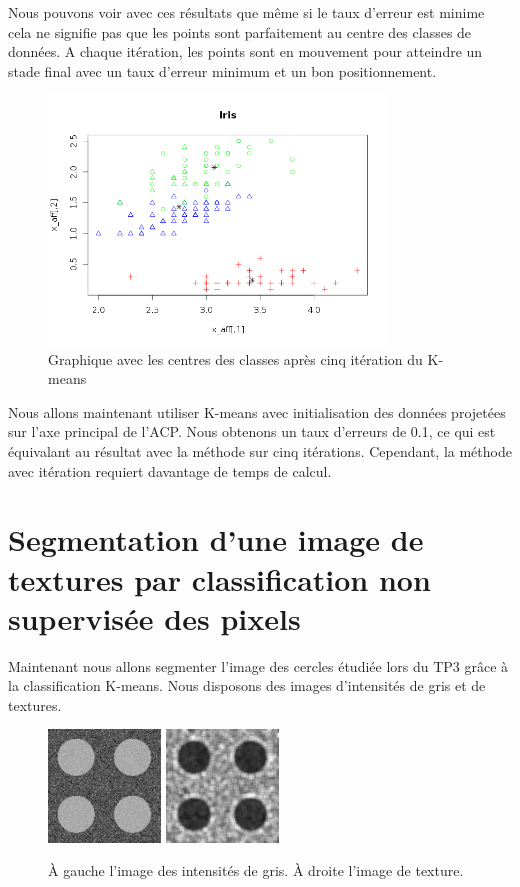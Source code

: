 \documentclass[a4paper,11pt]{article}
\begin{document}
  Nous pouvons voir avec ces résultats que même si le taux d'erreur est minime cela ne signifie pas
  que les points sont parfaitement au centre des classes de données. A chaque itération, les points
  sont en mouvement pour atteindre un stade final avec un taux d'erreur minimum et un bon positionnement.
 
  \begin{figure}[H]
    \center
    \includegraphics[width=9cm]{resultat/5_ite.png}
    \caption{Graphique avec les centres des classes après cinq itération du K-means}
  \end{figure}
  
  Nous allons maintenant utiliser K-means avec initialisation des données projetées sur l'axe principal
  de l'ACP. Nous obtenons un taux d'erreurs de 0.1, ce qui est équivalant au résultat avec la méthode
  sur cinq itérations. Cependant, la méthode avec itération requiert davantage de temps de calcul.
  
  
  \section{Segmentation d'une image de textures par classification non supervisée des pixels}
  Maintenant nous allons segmenter l'image des cercles étudiée lors du TP3 grâce à la classification
  K-means. Nous disposons des images d'intensités de gris et de textures.
  
  \begin{figure}[H]
    \center
    \includegraphics[width=3cm]{resultat/rdf-2-classes-texture-1.png}
    \includegraphics[width=3cm]{resultat/rdf-2-classes-texture-1-text.png}
    \caption{À gauche l'image des intensités de gris. À droite l'image de texture.}
  \end{figure}
  
\end{document}
